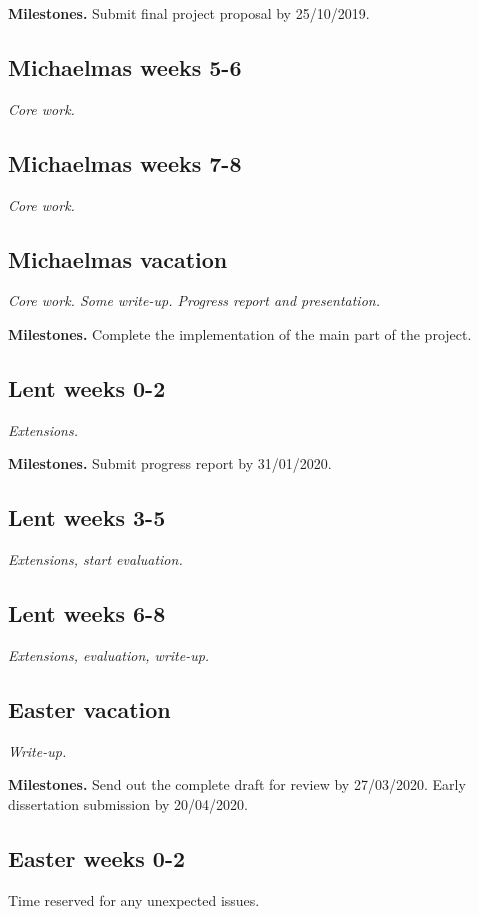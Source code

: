 \documentclass[12pt,a4paper,twoside]{article}
\begin{document}
\textbf{Milestones.} Submit final project proposal by 25/10/2019.

\subsection*{Michaelmas weeks 5-6}
\textit{Core work.}

\subsection*{Michaelmas weeks 7-8}
\textit{Core work.}

\subsection*{Michaelmas vacation}
\textit{Core work. Some write-up. Progress report and presentation.}

\textbf{Milestones.} Complete the implementation of the main part of the project.

\subsection*{Lent weeks 0-2}
\textit{Extensions.}
 
\textbf{Milestones.} Submit progress report by 31/01/2020.

\subsection*{Lent weeks 3-5} 
\textit{Extensions, start evaluation.}

\subsection*{Lent weeks 6-8}
\textit{Extensions, evaluation, write-up.}

\subsection*{Easter vacation}
\textit{Write-up.}

\textbf{Milestones.} Send out the complete draft for review by 27/03/2020. Early dissertation submission by 20/04/2020.

\subsection*{Easter weeks 0-2}
 Time reserved for any unexpected issues.



\end{document}
